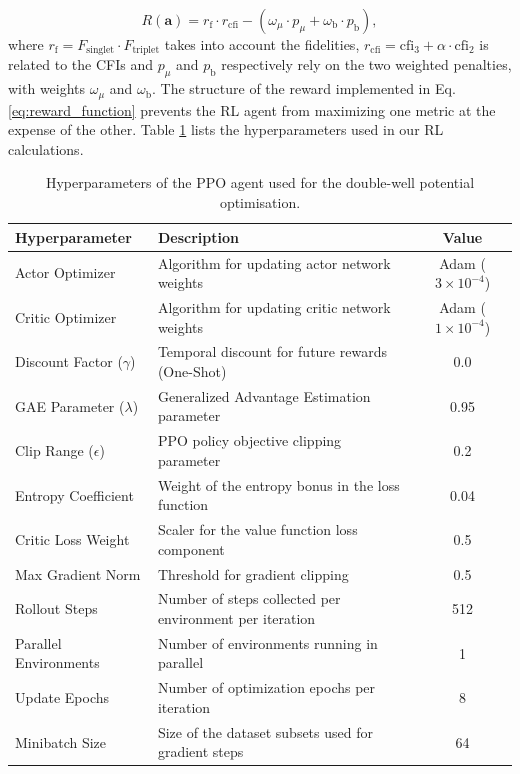 \documentclass[fleqn,10pt]{wlscirep}
\begin{document}
\begin{equation}
    R(\mathbf{a}) = r_\mathrm{f} \cdot r_\mathrm{cfi} - ( \omega_\mu \cdot p_\mu + \omega_\mathrm{b} \cdot p_\mathrm{b}),
    \label{eq:reward_function}
\end{equation}
where $r_\mathrm{f} = F_\mathrm{singlet} \cdot F_\mathrm{triplet}$ takes into account the fidelities, $r_\mathrm{cfi} = \mathrm{cfi}_3 + \alpha \cdot \mathrm{cfi}_{2}$ is related to the CFIs and $p_\mu$ and $p_\mathrm{b}$ respectively rely on the two weighted penalties, with weights $\omega_\mu$ and $\omega_\mathrm{b}$. The structure of the reward implemented in Eq. \eqref{eq:reward_function} prevents the RL agent from maximizing one metric at the expense of the other.
Table \ref{tab:ppo_hyperparameters} lists the hyperparameters used in our RL calculations.
\begin{table}[H]
\centering
\caption{Hyperparameters of the PPO agent used for the double-well potential optimisation.}
\label{tab:ppo_hyperparameters}
\begin{tabular}{llc}
\hline
\textbf{Hyperparameter} & \textbf{Description} & \textbf{Value} \\ \hline
Actor Optimizer & Algorithm for updating actor network weights & Adam ($3 \times 10^{-4}$) \\
Critic Optimizer & Algorithm for updating critic network weights & Adam ($1 \times 10^{-4}$) \\
Discount Factor ($\gamma$) & Temporal discount for future rewards (One-Shot) & 0.0 \\
GAE Parameter ($\lambda$) & Generalized Advantage Estimation parameter & 0.95 \\
Clip Range ($\epsilon$) & PPO policy objective clipping parameter & 0.2 \\
Entropy Coefficient & Weight of the entropy bonus in the loss function & 0.04 \\
Critic Loss Weight & Scaler for the value function loss component & 0.5 \\
Max Gradient Norm & Threshold for gradient clipping & 0.5 \\
Rollout Steps & Number of steps collected per environment per iteration & 512 \\
Parallel Environments & Number of environments running in parallel & 1 \\
Update Epochs & Number of optimization epochs per iteration & 8 \\
Minibatch Size & Size of the dataset subsets used for gradient steps & 64 \\ \hline
\end{tabular}
\end{table}
\end{document}
